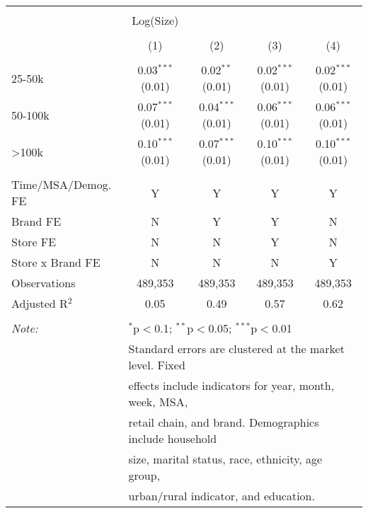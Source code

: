 
\begin{table}[!htbp] \centering 
  \caption{} 
  \label{tab:packageSizeFull7020} 
\begin{tabular}{@{\extracolsep{5pt}}lcccc} 
\\[-1.8ex]\hline 
\hline \\[-1.8ex] 
 & Log(Size) &  &  &  \\ 
\\[-1.8ex] & (1) & (2) & (3) & (4)\\ 
\hline \\[-1.8ex] 
 25-50k & 0.03$^{***}$ (0.01) & 0.02$^{**}$ (0.01) & 0.02$^{***}$ (0.01) & 0.02$^{***}$ (0.01) \\ 
  50-100k & 0.07$^{***}$ (0.01) & 0.04$^{***}$ (0.01) & 0.06$^{***}$ (0.01) & 0.06$^{***}$ (0.01) \\ 
  >100k & 0.10$^{***}$ (0.01) & 0.07$^{***}$ (0.01) & 0.10$^{***}$ (0.01) & 0.10$^{***}$ (0.01) \\ 
 \hline \\[-1.8ex] 
Time/MSA/Demog. FE & Y & Y & Y & Y \\ 
Brand FE & N & Y & Y & N \\ 
Store FE & N & N & Y & N \\ 
Store x Brand FE & N & N & N & Y \\ 
Observations & 489,353 & 489,353 & 489,353 & 489,353 \\ 
Adjusted R$^{2}$ & 0.05 & 0.49 & 0.57 & 0.62 \\ 
\hline 
\hline \\[-1.8ex] 
\textit{Note:}  & \multicolumn{4}{l}{$^{*}$p$<$0.1; $^{**}$p$<$0.05; $^{***}$p$<$0.01} \\ 
 & \multicolumn{4}{l}{Standard errors are clustered at the market level. Fixed } \\ 
 & \multicolumn{4}{l}{effects include indicators for year, month, week, MSA, } \\ 
 & \multicolumn{4}{l}{retail chain, and brand. Demographics include household } \\ 
 & \multicolumn{4}{l}{size, marital status, race, ethnicity, age group, } \\ 
 & \multicolumn{4}{l}{urban/rural indicator, and education.} \\ 
\end{tabular} 
\end{table} 
